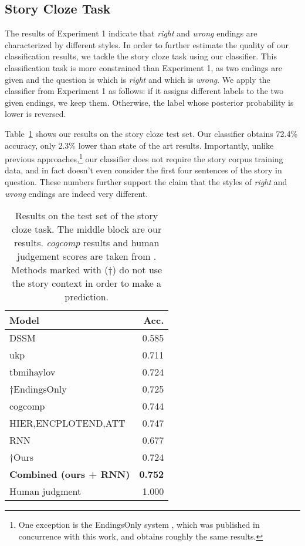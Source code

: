 \documentclass[11pt,a4paper]{article}
\newcommand{\tabref}[1]{Table~\ref{#1}}
\begin{document}
\subsection{Story Cloze Task}
The results of Experiment 1 indicate that {\it right} and {\it wrong} endings are characterized by different styles.
In order to further estimate the quality of our classification results, we tackle the story cloze task using our classifier.
This classification task is more constrained than Experiment 1, as two
endings are given and the question is which is \emph{right} and which is
\emph{wrong}.
We apply the classifier from Experiment 1 as follows:
if it assigns different labels to the two given endings, we keep
them.  Otherwise, the label whose posterior probability is lower is reversed.

\tabref{cloze_results} shows our results on the story cloze test
set. Our classifier obtains 72.4\% accuracy, only 2.3\% lower than state of the art results.
Importantly, unlike previous approaches,\footnote{One exception is the  EndingsOnly system \cite{Cai:2017}, which was published in concurrence with this work, and obtains roughly the same results.} our classifier does not require the story corpus training data, and in fact doesn't even consider the first four sentences of the story in question.
These numbers further support the claim that the styles of {\it right} and {\it wrong} endings are indeed very different.


\begin{table}[!t]
\small
\begin{center}
\begin{tabular}{|l|r|} \hline
{\bf Model} & {\bf Acc.} \\ \hline
{DSSM} \cite{Mostafazadeh:2016} & 0.585 \\ 
{ukp} \cite{Mihaylov:2017} & 0.711\\ 
{tbmihaylov} \cite{Mihaylov:2017} & 0.724\\ 
$\dagger$EndingsOnly \cite{Cai:2017} & 0.725 \\
{cogcomp}  & 0.744 \\ 
{HIER,ENCPLOTEND,ATT} \cite{Cai:2017} & 0.747 \\\hline\hline
{RNN}		& 0.677 \\ 
$\dagger${Ours} & {0.724} \\ 
{\bf Combined (ours + RNN)} & {\bf 0.752} \\ \hline\hline
Human judgment & 1.000 \\ \hline
\end{tabular}
\end{center}
\caption{\label{cloze_results} Results on the test set of the  story cloze task.
The middle block are our results.
{\it cogcomp} results and human judgement scores are taken from \cite{Mostafazadeh:2017}.
Methods marked with ($\dagger$) do not use the story context in order to make a prediction.}
\end{table}
\end{document}
